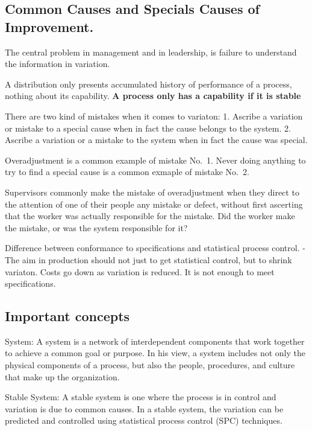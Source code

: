 \documentclass[11pt]{article}
\begin{document}
\hypertarget{common-causes-and-specials-causes-of-improvement.}{%
\subsection{Common Causes and Specials Causes of
Improvement.}\label{common-causes-and-specials-causes-of-improvement.}}

The central problem in management and in leadership, is failure to
understand the information in variation.

A distribution only presents accumulated history of performance of a
process, nothing about its capability. \textbf{A process only has a
capability if it is stable}

There are two kind of mistakes when it comes to variaton: 1. Ascribe a
variation or mistake to a special cause when in fact the cause belongs
to the system. 2. Ascribe a variation or a mistake to the system when in
fact the cause was special.

Overadjustment is a common example of mistake No.~1. Never doing
anything to try to find a special cause is a common exmaple of mistake
No.~2.

Supervisors commonly make the mistake of overadjustment when they direct
to the attention of one of their people any mistake or defect, without
first ascerting that the worker was actually responsible for the
mistake. Did the worker make the mistake, or was the system responsible
for it?

Difference between conformance to specifications and statistical process
control. - The aim in production should not just to get statistical
control, but to shrink variaton. Costs go down as variation is reduced.
It is not enough to meet specifications.

\hypertarget{important-concepts}{%
\subsection{Important concepts}\label{important-concepts}}

System: A system is a network of interdependent components that work
together to achieve a common goal or purpose. In his view, a system
includes not only the physical components of a process, but also the
people, procedures, and culture that make up the organization.

Stable System: A stable system is one where the process is in control
and variation is due to common causes. In a stable system, the variation
can be predicted and controlled using statistical process control (SPC)
techniques.
\end{document}
